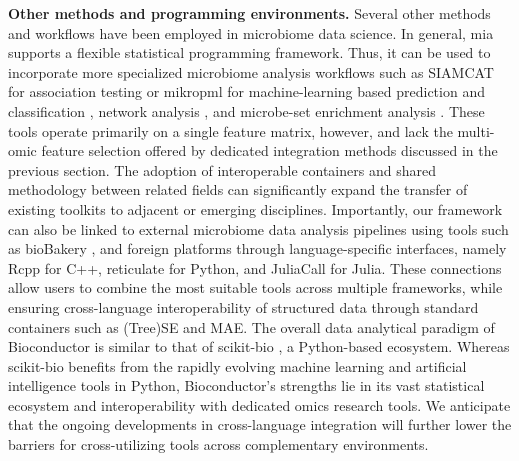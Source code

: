\documentclass[
  sn-nature,
]{sn-jnl}
\begin{document}
\textbf{Other methods and programming environments.} Several other
methods and workflows have been employed in microbiome data science. In
general, mia supports a flexible statistical programming framework.
Thus, it can be used to incorporate more specialized microbiome analysis
workflows such as SIAMCAT for association testing \citep{wirbel2021} or
mikropml for machine-learning based prediction and classification
\citep{topcuoglu2021}, network analysis \citep{peschel2021}, and
microbe-set enrichment analysis \citep{kou2020, pham2025}. These tools
operate primarily on a single feature matrix, however, and lack the
multi-omic feature selection offered by dedicated integration methods
discussed in the previous section. The adoption of interoperable
containers and shared methodology between related fields can
significantly expand the transfer of existing toolkits to adjacent or
emerging disciplines. Importantly, our framework can also be linked to
external microbiome data analysis pipelines using tools such as
bioBakery \citep{beghini2021}, and foreign platforms through
language-specific interfaces, namely Rcpp for C++, reticulate for
Python, and JuliaCall for Julia. These connections allow users to
combine the most suitable tools across multiple frameworks, while
ensuring cross-language interoperability of structured data through
standard containers such as (Tree)SE and MAE. The overall data
analytical paradigm of Bioconductor is similar to that of scikit-bio
\citep{aton2026}, a Python-based ecosystem. Whereas scikit-bio benefits
from the rapidly evolving machine learning and artificial intelligence
tools in Python, Bioconductor's strengths lie in its vast statistical
ecosystem and interoperability with dedicated omics research tools. We
anticipate that the ongoing developments in cross-language integration
will further lower the barriers for cross-utilizing tools across
complementary environments.
\end{document}
